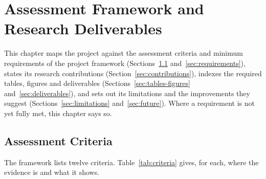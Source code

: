 \chapter{Assessment Framework and Research Deliverables}
\label{ch:assessment_and_deliverables}

This chapter maps the project against the assessment criteria and minimum requirements of the project framework (Sections~\ref{sec:criteria} and~\ref{sec:requirements}), states its research contributions (Section~\ref{sec:contributions}), indexes the required tables, figures and deliverables (Sections~\ref{sec:tables-figures} and~\ref{sec:deliverables}), and sets out its limitations and the improvements they suggest (Sections~\ref{sec:limitations} and~\ref{sec:future}). Where a requirement is not yet fully met, this chapter says so.

\section{Assessment Criteria}
\label{sec:criteria}

The framework lists twelve criteria. Table~\ref{tab:criteria} gives, for each, where the evidence is and what it shows.

